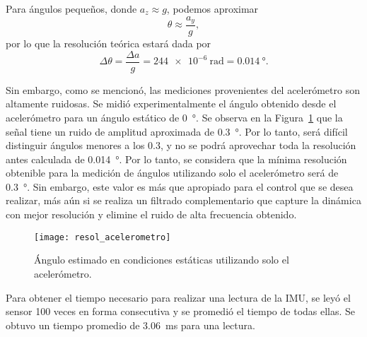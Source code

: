 Para ángulos pequeños, donde $a_z \approx g$, podemos aproximar
$$\theta \approx \frac{a_y}{g},$$
por lo que la resolución teórica estará dada por
$$\Delta \theta = \frac{\Delta a}{g} = \qty{244e-6}{\radian} = \qty{0.014}{\degree}.$$

Sin embargo, como se mencionó, las mediciones provenientes del acelerómetro son altamente ruidosas. Se midió experimentalmente el ángulo obtenido desde el acelerómetro para un ángulo estático de \qty{0}{\degree}. Se observa en la Figura~\ref{fig:ruido-acel} que la señal tiene un ruido de amplitud aproximada de \qty{0.3}{\degree}. Por lo tanto, será difícil distinguir ángulos menores a los \qty{0.3}{\deg}, y no se podrá aprovechar toda la resolución antes calculada de \qty{0.014}{\degree}. Por lo tanto, se considera que la mínima resolución obtenible para la medición de ángulos utilizando solo el acelerómetro será de \qty{0.3}{\degree}. Sin embargo, este valor es más que apropiado para el control que se desea realizar, más aún si se realiza un filtrado complementario que capture la dinámica con mejor resolución y elimine el ruido de alta frecuencia obtenido.

\begin{figure}
    \centering
    \texttt{[image: resol\_acelerometro]}
    \caption{Ángulo estimado en condiciones estáticas utilizando solo el acelerómetro.}
    \label{fig:ruido-acel}
\end{figure}

Para obtener el tiempo necesario para realizar una lectura de la IMU, se leyó el sensor 100 veces en forma consecutiva y se promedió el tiempo de todas ellas. Se obtuvo un tiempo promedio de \qty{3.06}{\ms} para una lectura.

